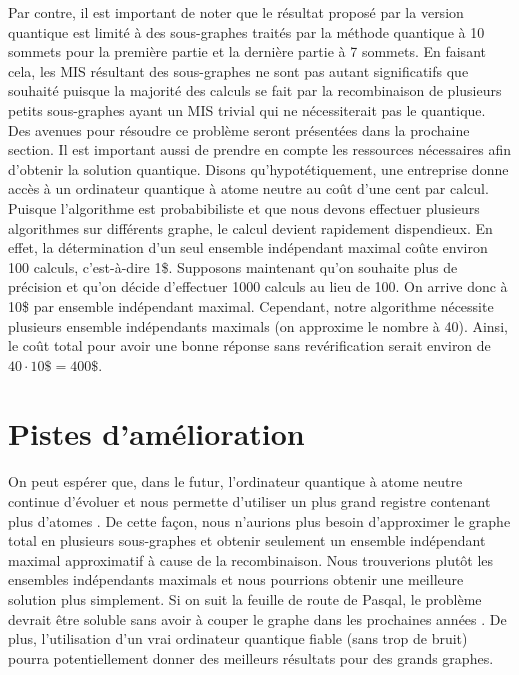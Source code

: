 \documentclass[11pt]{article}
\begin{document}
Par contre, il est important de noter que le résultat proposé par la version quantique est limité à des sous-graphes traités par la méthode quantique à 10 sommets pour la première partie et la dernière partie à 7 sommets. En faisant cela, les MIS résultant des sous-graphes ne sont pas autant significatifs que souhaité puisque la majorité des calculs se fait par la recombinaison de plusieurs petits sous-graphes ayant un MIS trivial qui ne nécessiterait pas le quantique. Des avenues pour résoudre ce problème seront présentées dans la prochaine section. Il est important aussi de prendre en compte les ressources nécessaires afin d'obtenir la solution quantique. Disons qu'hypotétiquement, une entreprise donne accès à un ordinateur quantique à atome neutre au coût d'une cent par calcul. Puisque l'algorithme est probabibiliste et que nous devons effectuer plusieurs algorithmes sur différents graphe, le calcul devient rapidement dispendieux. En effet, la détermination d'un seul ensemble indépendant maximal coûte environ 100 calculs, c'est-à-dire 1\$. Supposons maintenant qu'on souhaite plus de précision et qu'on décide d'effectuer 1000 calculs au lieu de 100. On arrive donc à 10\$ par ensemble indépendant maximal. Cependant, notre algorithme nécessite plusieurs ensemble indépendants maximals (on approxime le nombre à 40). Ainsi, le coût total pour avoir une bonne réponse sans revérification serait environ de $40\cdot10\$ = 400\$$. 


\section{Pistes d'amélioration}

On peut espérer que, dans le futur, l'ordinateur quantique à atome neutre continue d'évoluer et nous permette d'utiliser un plus grand registre contenant plus d'atomes \cite{noauthor_pasqal_nodate}. De cette façon, nous n'aurions plus besoin d'approximer le graphe total en plusieurs sous-graphes et obtenir seulement un ensemble indépendant maximal approximatif à cause de la recombinaison. Nous trouverions plutôt les ensembles indépendants maximals et nous pourrions obtenir une meilleure solution plus simplement. Si on suit la feuille de route de Pasqal, le problème devrait être soluble sans avoir à couper le graphe dans les prochaines années \cite{noauthor_our_nodate}. De plus, l'utilisation d'un vrai ordinateur quantique fiable (sans trop de bruit) pourra potentiellement donner des meilleurs résultats pour des grands graphes.
\end{document}
